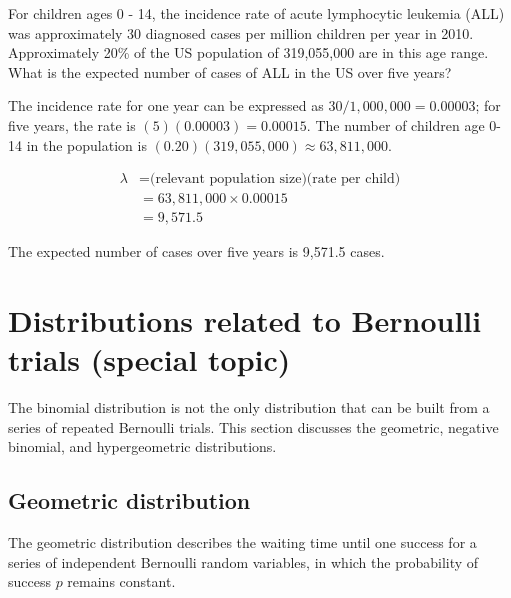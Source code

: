 \begin{example}{
For children ages 0 - 14, the incidence rate of acute lymphocytic leukemia (ALL) was approximately 30 diagnosed cases per million children per year in 2010. Approximately 20\% of the US population of 319,055,000 are in this age range. What is the expected number of cases of ALL in the US over five years?}

The incidence rate for one year can be expressed as $30/1,000,000 = 0.00003$; for five years, the rate is $(5)(0.00003) = 0.00015$. The number of children age 0-14 in the population is $(0.20)(319,055,000) \approx 63,811,000$. 

\begin{align*}
\lambda &= \text{(relevant population size)(rate per child)} \\
&= 63,811,000 \times 0.00015 \\
&= 9,571.5
\end{align*}
	
The expected number of cases over five years is 9,571.5 cases.	
	
\end{example}



\section{Distributions related to Bernoulli trials (special topic)}

The binomial distribution is not the only distribution that can be built from a series of repeated Bernoulli trials. This section discusses the geometric, negative binomial, and hypergeometric distributions.

\subsection{Geometric distribution}
\label{geomDist}


The geometric distribution describes the waiting time until one success for a series of independent Bernoulli random variables, in which the probability of success $p$ remains constant.

